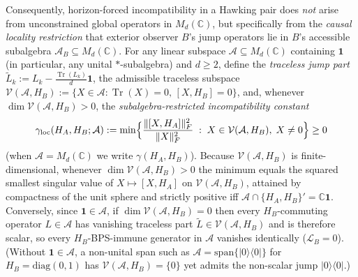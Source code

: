 \documentclass[11pt,a4paper]{article}
\theoremstyle{definition}
\theoremstyle{remark}
\newcommand{\Tr}{\operatorname{Tr}}
\newcommand{\cA}{\mathcal{A}}
\newcommand{\cL}{\mathcal{L}}
\newcommand{\bbC}{\mathbb{C}}
\newcommand{\1}{\mathbf{1}}
\newcommand{\normF}[1]{\|#1\|_F}
\begin{document}
Consequently, horizon-forced incompatibility in a Hawking pair does \emph{not} arise from unconstrained global operators in $M_d(\bbC)$, but specifically from the \emph{causal locality restriction} that exterior observer $B$'s jump operators lie in $B$'s accessible subalgebra $\cA_B \subseteq M_d(\bbC)$. For any linear subspace $\cA \subseteq M_d(\bbC)$ containing $\1$ (in particular, any unital $*$-subalgebra) and $d \ge 2$, define the \emph{traceless jump part} $\tilde{L}_k := L_k - \frac{\Tr(L_k)}{d}\1$, the admissible traceless subspace $\mathcal{V}(\cA, H_B) := \{X\in\cA : \Tr(X)=0,\,[X,H_B]=0\}$, and, whenever $\dim\mathcal{V}(\cA, H_B) > 0$, the \emph{subalgebra-restricted incompatibility constant}
\begin{equation}\label{eq:gamma-loc-def}
  \gamma_{\mathrm{loc}}(H_A, H_B; \cA) := \min\Bigl\{\frac{\normF{[X, H_A]}^2}{\normF{X}^2} \;:\; X \in \mathcal{V}(\cA,H_B),\; X \neq 0\Bigr\} \ge 0
\end{equation}
(when $\cA = M_d(\bbC)$ we write $\gamma(H_A, H_B)$). Because $\mathcal{V}(\cA,H_B)$ is finite-dimensional, whenever $\dim\mathcal{V}(\cA,H_B)>0$ the minimum equals the squared smallest singular value of $X\mapsto [X,H_A]$ on $\mathcal{V}(\cA,H_B)$, attained by compactness of the unit sphere and strictly positive iff $\cA\cap\{H_A,H_B\}' = \bbC\1$. Conversely, since $\1\in\cA$, if $\dim\mathcal{V}(\cA,H_B)=0$ then every $H_B$-commuting operator $L\in\cA$ has vanishing traceless part $\tilde{L}\in\mathcal{V}(\cA,H_B)$ and is therefore scalar, so every $H_B$-BPS-immune generator in $\cA$ vanishes identically ($\cL_B=0$). (Without $\1\in\cA$, a non-unital span such as $\cA=\mathrm{span}\{|0\rangle\langle 0|\}$ for $H_B=\mathrm{diag}(0,1)$ has $\mathcal{V}(\cA,H_B)=\{0\}$ yet admits the non-scalar jump $|0\rangle\langle 0|$.)
\end{document}

